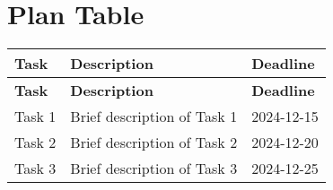 \documentclass{article}
\begin{document}
\section*{Plan Table}

\renewcommand{\arraystretch}{1.5} %
\setlength{\tabcolsep}{8pt}      %
\begin{longtable}{|p{4cm}|p{8cm}|p{3cm}|} %
\hline
\textbf{Task} & \textbf{Description} & \textbf{Deadline} \\
\hline
\endfirsthead
\hline
\textbf{Task} & \textbf{Description} & \textbf{Deadline} \\
\hline
\endhead

Task 1 & Brief description of Task 1 & 2024-12-15 \\
\hline
Task 2 & Brief description of Task 2 & 2024-12-20 \\
\hline
Task 3 & Brief description of Task 3 & 2024-12-25 \\
\hline

\end{longtable}
\end{document}
